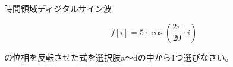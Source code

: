 時間領域ディジタルサイン波 

\[
f[i] = 5 \cdot \cos \left ( \frac{2 \pi}{20}  \cdot i \right )
\]

\noindent の位相を反転させた式を選択肢a〜dの中から1つ選びなさい。
